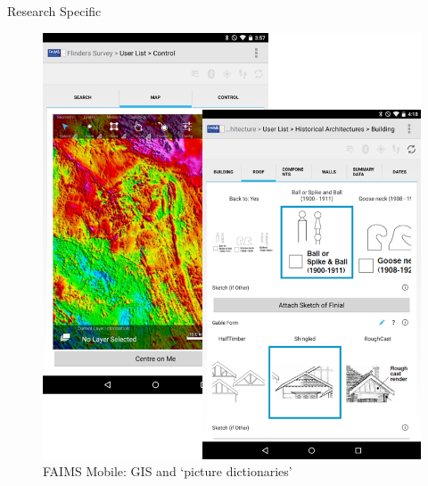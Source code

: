 \documentclass[aspectratio=169, 12pt]{beamer} %
\begin{document}
\begin{frame}{Research Specific}
 \begin{figure}[H]
    \centering
        \includegraphics[height=.75\textheight]{figures/FAIMS-screenshots.png}
        \caption{FAIMS Mobile: GIS and `picture dictionaries'}
        \label{fig:FAIMS-mobile-screenshots}
 \end{figure}
\end{frame}
\end{document}

